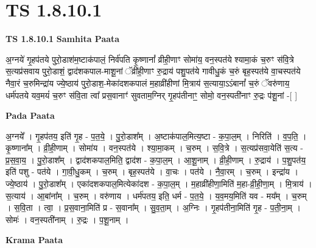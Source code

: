 \documentclass[17pt]{extarticle}
\begin{document}
\section{ TS 1.8.10.1 }

\textbf{TS 1.8.10.1 } \newline
\textbf{Samhita Paata} \newline

अ॒ग्नये॑ गृ॒हप॑तये पुरो॒डाश॑म॒ष्टाक॑पालं॒ निर्व॑पति कृ॒ष्णानां᳚ व्रीही॒णाꣳ सोमा॑य॒ वन॒स्पत॑ये श्यामा॒कं च॒रुꣳ स॑वि॒त्रे स॒त्यप्र॑सवाय पुरो॒डाशं॒ द्वाद॑शकपाल-माशू॒नां ॅव्री॑ही॒णाꣳ रु॒द्राय॑ पशु॒पत॑ये गावीधु॒कं च॒रुं बृह॒स्पत॑ये वा॒चस्पत॑ये नैवा॒रं च॒रुमिन्द्रा॑य ज्ये॒ष्ठाय॑ पुरो॒डाश॒-मेका॑दशकपालं म॒हाव्री॑हीणां मि॒त्राय॑ स॒त्याया॒ऽऽंबानां᳚ च॒रुं ॅवरु॑णाय॒ धर्म॑पतये यव॒मयं॑ च॒रुꣳ स॑वि॒ता त्वा᳚ प्रस॒वानाꣳ॑ सुवताम॒ग्निर् गृ॒हप॑तीनाꣳ॒॒ सोमो॒ वन॒स्पती॑नाꣳ रु॒द्रः प॑शू॒नां -[ ] \newline

\textbf{Pada Paata} \newline

अ॒ग्नये᳚ । गृ॒हप॑तय॒ इति॑ गृ॒ह - प॒त॒ये॒ । पु॒रो॒डाश᳚म् । अ॒ष्टाक॑पाल॒मित्य॒ष्टा - क॒पा॒ल॒म् । निरिति॑ । व॒प॒ति॒ । कृ॒ष्णाना᳚म् । व्री॒ही॒णाम् । सोमा॑य । वन॒स्पत॑ये । श्या॒मा॒कम् । च॒रुम् । स॒वि॒त्रे । स॒त्यप्र॑सवा॒येति॑ स॒त्य - प्र॒स॒वा॒य॒ । पु॒रो॒डाश᳚म् । द्वाद॑शकपाल॒मिति॒ द्वाद॑श - क॒पा॒ल॒म् । आ॒शू॒नाम् । व्री॒ही॒णाम् । रु॒द्राय॑ । प॒शु॒पत॑य॒ इति॑ पशु - पत॑ये । गा॒वी॒धु॒कम् । च॒रुम् । बृह॒स्पत॑ये । वा॒चः । पत॑ये । नै॒वा॒रम् । च॒रुम् । इन्द्रा॑य । ज्ये॒ष्ठाय॑ । पु॒रो॒डाश᳚म् । एका॑दशकपाल॒मित्येका॑दश - क॒पा॒ल॒म् । म॒हाव्री॑हीणा॒मिति॑ म॒हा-व्री॒ही॒णा॒म् । मि॒त्राय॑ । स॒त्याय॑ । आ॒बांना᳚म् । च॒रुम् । वरु॑णाय । धर्म॑पतय॒ इति॒ धर्म - प॒त॒ये॒ । य॒व॒मय॒मिति॑ यव - मय᳚म् । च॒रुम् । स॒वि॒ता । त्वा॒ । प्र॒स॒वाना॒मिति॑ प्र - स॒वाना᳚म् । सु॒व॒ता॒म् । अ॒ग्निः । गृ॒हप॑तीना॒मिति॑ गृ॒ह - प॒ती॒ना॒म् । सोमः॑ । वन॒स्पती॑नाम् । रु॒द्रः । प॒शू॒नाम् ।  \newline


\textbf{Krama Paata} \newline
\end{document}
